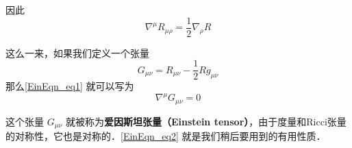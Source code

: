 因此
\begin{equation}\label{EinEqn_eq1}
\nabla^\mu R_{\mu\rho}=\frac{1}{2}\nabla_\rho R
\end{equation}



这么一来，如果我们定义一个张量
\begin{equation}
G_{\mu\nu}=R_{\mu\nu}-\frac{1}{2}Rg_{\mu\nu}
\end{equation}
那么\autoref{EinEqn_eq1} 就可以写为
\begin{equation}\label{EinEqn_eq2}
\nabla^\mu G_{\mu\nu}=0
\end{equation}

这个张量 $G_{\mu\nu}$ 就被称为\textbf{爱因斯坦张量（Einstein tensor）}，由于度量和Ricci张量的对称性，它也是对称的．\autoref{EinEqn_eq2} 就是我们稍后要用到的有用性质．









